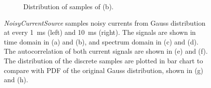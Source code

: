 \begin{figure}[tbp!]
\begin{subfigure}[t]{0.43\textwidth}
			\caption{Distribution of samples of (b).}
		\end{subfigure}
		\caption{\textit{NoisyCurrentSource} samples noisy currents from Gauss distribution at every 1~ms (left) and 10~ms (right). The signals are shown in time domain in (a) and (b), and spectrum domain in (c) and (d). The autocorrelation of both current signals are shown in (e) and (f). The distribution of the discrete samples are plotted in bar chart to compare with PDF of the original Gauss distribution, shown in (g) and (h).}
		\label{Fig:lif_curr}
	\end{figure}

